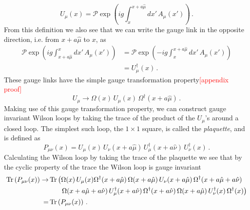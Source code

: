 \begin{equation}
U_\mu(x) = \mathcal{P}\exp\left(ig\int_x^{x+a\hat{\mu}}dx'\,A_\mu(x')\right)\, .
\label{eq:GaugeLink}
\end{equation}
From this definition we also see that we can write the gauge link in the opposite direction, i.e. from $x+a\hat{\mu}$ to $x$, as
\begin{align*}
\mathcal{P}\exp\left(ig\int^x_{x+a\hat{\mu}}dx'\,A_\mu(x')\right) &= \mathcal{P}\exp\left(-ig\int_x^{x+a\hat{\mu}}dx'\,A_\mu(x')\right)\\
&=U^\dag_\mu(x)\, .
\end{align*}
These gauge links have the simple gauge transformation property\textcolor{red}{[appendix proof]}~\cite{Lepage:1998dt}
\begin{equation}
U_\mu\rightarrow \Omega(x)\,U_\mu(x)\,\Omega^\dag(x+a\hat{\mu})\, .
\end{equation}
Making use of this gauge transformation property, we can construct gauge invariant Wilson loops by taking the trace of the product of the $U_\mu$'s around a closed loop. The simplest such loop, the $1\times 1$ square, is called the \textit{plaquette}, and is defined as
\begin{equation}
P_{\mu\nu}(x) = U_\mu(x)\,U_\nu(x+a\hat{\mu})\, U_\mu^\dag(x+a\hat{\nu})\, U_\nu^\dag(x)\, .
\label{eq:Plaquette}
\end{equation}
Calculating the Wilson loop by taking the trace of the plaquette we see that by the cyclic property of the trace the Wilson loop is gauge invariant
\begin{align*}
\operatorname{Tr}\left(P_{\mu\nu}(x)\right)\rightarrow& \operatorname{Tr} \left(\Omega(x)\,U_\mu(x)\Omega^\dag(x+a\hat{\mu})\,\Omega(x+a\hat{\mu})\,U_\nu(x+a\hat{\mu})\,\Omega^\dag(x+a\hat{\mu}+a\hat{\nu})\right.\\
&~~~~~\left.\Omega(x+a\hat{\mu}+a\hat{\nu})\,U_\mu^\dag(x+a\hat{\nu})\,\Omega^\dag(x+a\hat{\nu})\,\Omega(x+a\hat{\mu})\, U_\nu^\dag(x)\,\Omega^\dag(x)\right)\\
=&\operatorname{Tr}\left(P_{\mu\nu}(x)\right)\, .
\end{align*}\\

